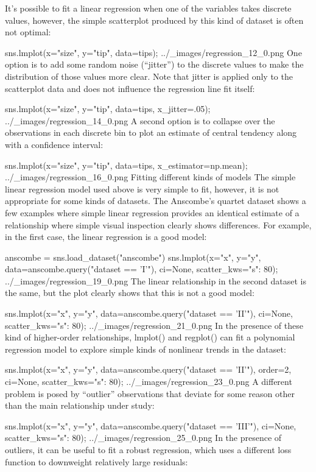 It’s possible to fit a linear regression when one of the variables takes discrete values, however, the simple scatterplot produced by this kind of dataset is often not optimal:

sns.lmplot(x="size", y="tip", data=tips);
../_images/regression_12_0.png
One option is to add some random noise (“jitter”) to the discrete values to make the distribution of those values more clear. Note that jitter is applied only to the scatterplot data and does not influence the regression line fit itself:

sns.lmplot(x="size", y="tip", data=tips, x_jitter=.05);
../_images/regression_14_0.png
A second option is to collapse over the observations in each discrete bin to plot an estimate of central tendency along with a confidence interval:

sns.lmplot(x="size", y="tip", data=tips, x_estimator=np.mean);
../_images/regression_16_0.png
Fitting different kinds of models
The simple linear regression model used above is very simple to fit, however, it is not appropriate for some kinds of datasets. The Anscombe’s quartet dataset shows a few examples where simple linear regression provides an identical estimate of a relationship where simple visual inspection clearly shows differences. For example, in the first case, the linear regression is a good model:

anscombe = sns.load_dataset("anscombe")
sns.lmplot(x="x", y="y", data=anscombe.query("dataset == 'I'"),
           ci=None, scatter_kws={"s": 80});
../_images/regression_19_0.png
The linear relationship in the second dataset is the same, but the plot clearly shows that this is not a good model:

sns.lmplot(x="x", y="y", data=anscombe.query("dataset == 'II'"),
           ci=None, scatter_kws={"s": 80});
../_images/regression_21_0.png
In the presence of these kind of higher-order relationships, lmplot() and regplot() can fit a polynomial regression model to explore simple kinds of nonlinear trends in the dataset:

sns.lmplot(x="x", y="y", data=anscombe.query("dataset == 'II'"),
           order=2, ci=None, scatter_kws={"s": 80});
../_images/regression_23_0.png
A different problem is posed by “outlier” observations that deviate for some reason other than the main relationship under study:

sns.lmplot(x="x", y="y", data=anscombe.query("dataset == 'III'"),
           ci=None, scatter_kws={"s": 80});
../_images/regression_25_0.png
In the presence of outliers, it can be useful to fit a robust regression, which uses a different loss function to downweight relatively large residuals:

